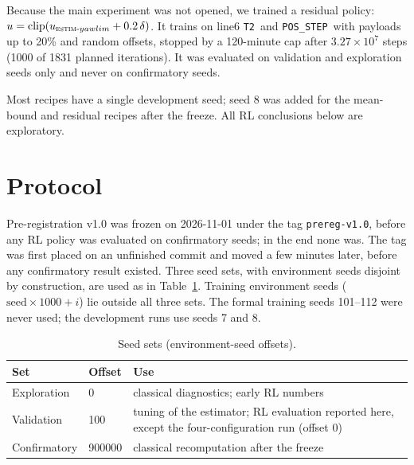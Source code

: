 \documentclass[conference]{IEEEtran}
\newcommand{\POS}{\texttt{POS\_STEP}}
\newcommand{\TT}{\texttt{T2}}
\newcommand{\estim}{\textsc{estim}}
\begin{document}
Because the main experiment was not opened, we trained a residual policy: $u=\mathrm{clip}(u_{\estim\text{-}yawlim}+0.2\,\delta)$. %
It trains on line6 \TT\ and \POS\ with payloads up to 20\% and random offsets, stopped by a 120-minute cap after $3.27\times10^7$ steps (1000 of 1831 planned iterations). %
It was evaluated on validation and exploration seeds only and never on confirmatory seeds. %

Most recipes have a single development seed; seed 8 was added for the mean-bound and residual recipes after the freeze. %
All RL conclusions below are exploratory.

\section{Protocol}\label{sec:protocol}
Pre-registration v1.0 was frozen on 2026-11-01 under the tag \texttt{prereg-v1.0}, before any RL policy was evaluated on confirmatory seeds; in the end none was. %
The tag was first placed on an unfinished commit and moved a few minutes later, before any confirmatory result existed. %
Three seed sets, with environment seeds disjoint by construction, are used as in Table~\ref{tab:seeds}. %
Training environment seeds ($\text{seed}\times1000+i$) lie outside all three sets. The formal training seeds 101--112 were never used; the development runs use seeds 7 and 8. %

\begin{table}[t]
\caption{Seed sets (environment-seed offsets).}\label{tab:seeds}
\centering\small
\begin{tabular}{@{}llp{4.6cm}@{}}
\toprule
Set & Offset & Use \\
\midrule
Exploration & 0 & classical diagnostics; early RL numbers \\ %
Validation & 100 & tuning of the estimator; RL evaluation reported here, except the four-configuration run (offset 0) \\ %
Confirmatory & 900000 & classical recomputation after the freeze \\ %
\bottomrule
\end{tabular}
\end{table}
\end{document}
